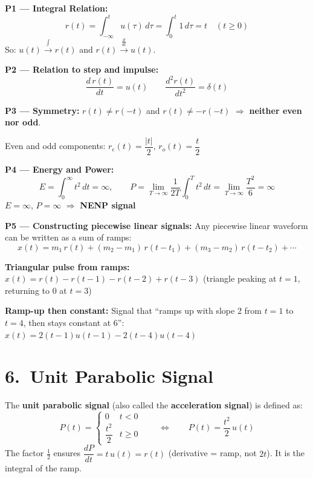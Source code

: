 \documentclass[10pt,a4paper]{article}
\newcommand{\Intt}{\displaystyle\int_{-\infty}^{t}}
\begin{document}
\begin{propbox}
\textbf{P1 --- Integral Relation:}
\[
  r(t) = \Intt u(\tau)\,d\tau = \int_0^t 1\,d\tau = t \quad (t \geq 0)
\]
So: $u(t)\xrightarrow{\int} r(t)$ and $r(t)\xrightarrow{\frac{d}{dt}} u(t)$.

\medskip
\textbf{P2 --- Relation to step and impulse:}
\[
  \frac{d\,r(t)}{dt} = u(t) \qquad \frac{d^2 r(t)}{dt^2} = \delta(t)
\]

\medskip
\textbf{P3 --- Symmetry:}
$r(t) \neq r(-t)$ and $r(t) \neq -r(-t)$ $\Rightarrow$ \textbf{neither even nor odd}.

Even and odd components: $r_e(t) = \dfrac{|t|}{2}$, \quad $r_o(t) = \dfrac{t}{2}$

\medskip
\textbf{P4 --- Energy and Power:}
\[
  E = \int_0^\infty t^2\,dt = \infty, \qquad P = \lim_{T\to\infty}\frac{1}{2T}\int_0^T t^2\,dt = \lim_{T\to\infty}\frac{T^2}{6} = \infty
\]
$E = \infty$, $P = \infty$ $\Rightarrow$ \textbf{NENP signal}

\medskip
\textbf{P5 --- Constructing piecewise linear signals:}
Any piecewise linear waveform can be written as a sum of ramps:
\[
x(t) = m_1\,r(t) + (m_2-m_1)\,r(t-t_1) + (m_3-m_2)\,r(t-t_2) + \cdots
\]
\end{propbox}

\begin{exbox}
\textbf{Triangular pulse from ramps:}
$x(t)=r(t)-r(t-1)-r(t-2)+r(t-3)$ (triangle peaking at $t=1$, returning to $0$ at $t=3$)

\textbf{Ramp-up then constant:}
Signal that ``ramps up with slope 2 from $t=1$ to $t=4$, then stays constant at 6'':
$x(t)=2(t-1)u(t-1)-2(t-4)u(t-4)$
\end{exbox}

\section{6.\ Unit Parabolic Signal}

\begin{defbox}
The \textbf{unit parabolic signal} (also called the \textbf{acceleration signal}) is defined as:
\[
  P(t) = \begin{cases} 0 & t < 0 \\ \dfrac{t^2}{2} & t \geq 0 \end{cases}
  \qquad\Leftrightarrow\qquad P(t) = \frac{t^2}{2}\,u(t)
\]
The factor $\tfrac{1}{2}$ ensures $\dfrac{dP}{dt} = t\,u(t) = r(t)$ (derivative = ramp, not $2t$). It is the integral of the ramp.
\end{defbox}
\end{document}
